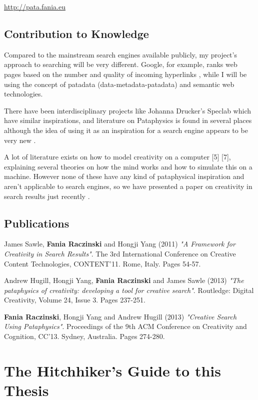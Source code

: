 \url{http://pata.fania.eu} \marginpar{!!!}

\subsection{Contribution to Knowledge}

Compared to the mainstream search engines available publicly, my project's approach to searching will be very different. Google, for example, ranks web pages based on the number and quality of incoming hyperlinks \citep{Google2012}, while I will be using the concept of patadata (data-metadata-patadata) and semantic web technologies.

There have been interdisciplinary projects like Johanna Drucker's Speclab \citep{Drucker2009} which have similar inspirations, and literature on Pataphysics is found in several places \citep{Bok2002, Hugill2012a} although the idea of using it as an inspiration for a search engine appears to be very new \citep{Hendler2013}.

A lot of literature exists on how to model creativity on a computer [5] [7], explaining several theories on how the mind works and how to simulate this on a machine. However none of these have any kind of pataphysical inspiration and aren't applicable to search engines, so we have presented a paper on creativity in search results just recently \citep{Raczinski2013}.

\subsection{Publications}

James Sawle, \textbf{Fania Raczinski} and Hongji Yang (2011) \emph{"A Framework for Creativity in Search Results"}. The 3rd International Conference on Creative Content Technologies, CONTENT'11. Rome, Italy. Pages 54-57. \citep{Sawle2011}

Andrew Hugill, Hongji Yang, \textbf{Fania Raczinski} and James Sawle (2013) \emph{"The pataphysics of creativity: developing a tool for creative search"}. Routledge: Digital Creativity, Volume 24, Issue 3. Pages 237-251. \citep{Hugill2013d}

\textbf{Fania Raczinski}, Hongji Yang and Andrew Hugill (2013) \emph{"Creative Search Using Pataphysics"}. Proceedings of the 9th ACM Conference on Creativity and Cognition, CC'13. Sydney, Australia. Pages 274-280. \citep{Raczinski2013}

\section{The Hitchhiker's Guide to this Thesis}

